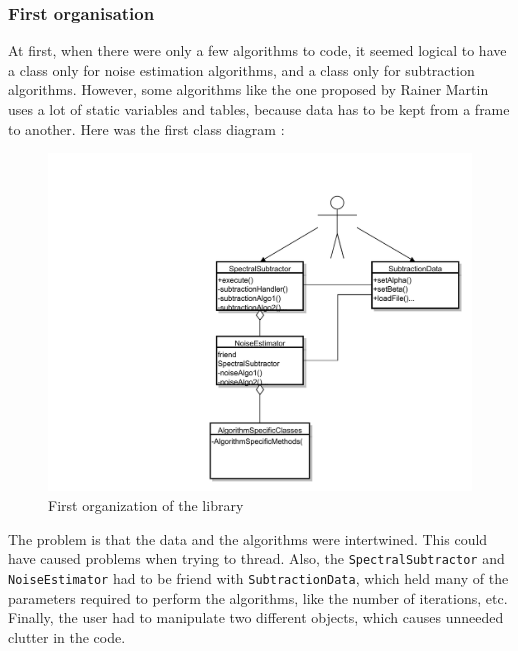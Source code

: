 \subsubsection{First organisation}
At first, when there were only a few algorithms to code, it seemed logical to have a class only for noise estimation algorithms, and a class only for subtraction algorithms. However, some algorithms like the one proposed by Rainer Martin\cite{martin2001noise} uses a lot of static variables and tables, because data has to be kept from a frame to another. 
Here was the first class diagram : 
\begin{figure}[H]
\begin{center}
\hspace{-11em}
\includegraphics[scale=0.5]{old.pdf}
\caption{First organization of the library}
\label{diag_api_chords}
\end{center}
\end{figure}
The problem is that the data and the algorithms were intertwined. This could have caused problems when trying to thread. Also, the \texttt{SpectralSubtractor} and \texttt{NoiseEstimator} had to be friend with \texttt{SubtractionData}, which held many of the parameters required to perform the algorithms, like the number of iterations, etc.
Finally, the user had to manipulate two different objects, which causes unneeded clutter in the code.
